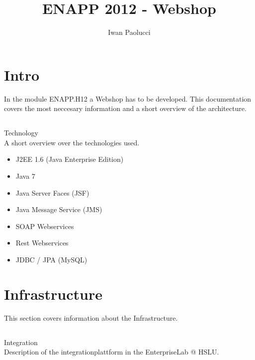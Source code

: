 \documentclass[11pt]{amsart}
\begin{document}
\title{ENAPP 2012 - Webshop}
\author{Iwan Paolucci}
%
\maketitle
%
\section{Intro}
In the module ENAPP.H12 a Webshop has to be developed. This documentation covers the most neccesary information and a short overview of the architecture. \\
\subsection{}Technology\\
A short overview over the technologies used.
\begin{itemize}
\item J2EE 1.6 (Java Enterprise Edition)
\item Java 7
\item Java Server Faces (JSF)
\item Java Message Service (JMS)
\item SOAP Webservices
\item Rest Webservices
\item JDBC / JPA (MySQL)
\end{itemize}
%
\newpage{}
\section{Infrastructure} 
%
This section covers information about the Infrastructure. \\
% 
\subsection{}Integration \\
Description of the integrationplattform in the EnterpriseLab @ HSLU.\\
\end{document}
